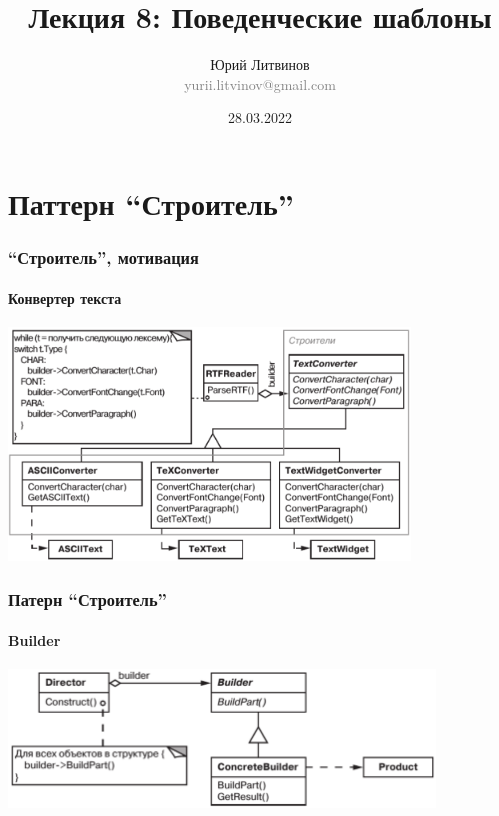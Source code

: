 \documentclass[xetex,mathserif,serif]{beamer}
\title[Шаблоны]{Лекция 8: Поведенческие шаблоны}
\author[Юрий Литвинов]{Юрий Литвинов\\\small{\textcolor{gray}{yurii.litvinov@gmail.com}}}
\date{28.03.2022}
\begin{document}
    \frame{\titlepage}

    \section{Паттерн ``Строитель''}

    \begin{frame}
        \frametitle{``Строитель'', мотивация}
        \framesubtitle{Конвертер текста}
        \begin{center}
            \includegraphics[width=0.8\textwidth]{textConverter.png}
        \end{center}
    \end{frame}

    \begin{frame}
        \frametitle{Патерн ``Строитель''}
        \framesubtitle{Builder}
        \begin{center}
            \includegraphics[width=0.85\textwidth]{builder.png}
        \end{center}
    \end{frame}
    
\end{document}
